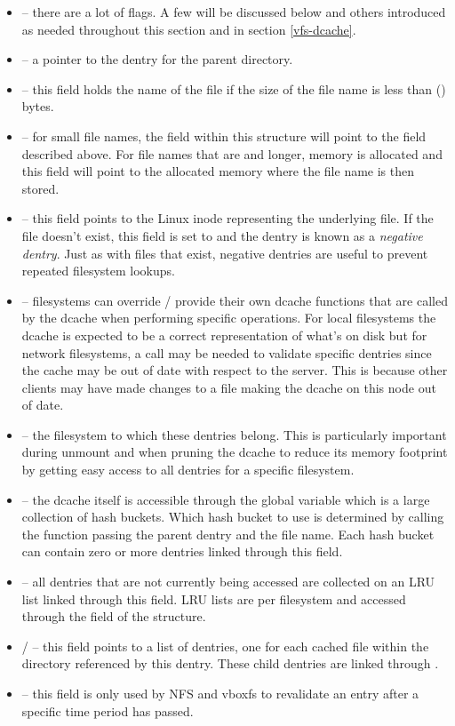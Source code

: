 \begin{itemize}
	\item {} -- there are a lot of flags. A few will be discussed below and others introduced as needed 
		throughout this section and in section \ref{vfs-dcache}.
	\item {} -- a pointer to the dentry for the parent directory.
	\item {} -- this field holds the name of the file if the size of the file name is less than 
		() bytes.
	\item {} -- for small file names, the  field within this  structure will point to the  field
		described above. For file names that are  and longer, memory is allocated 
		and this field will point to the allocated memory where the file name is then stored.
	\item {} -- this field points to the Linux inode representing the underlying file. If the file doesn't exist, this
		field is set to  and the dentry is known as a \textit{negative dentry}. Just as with files that exist, 
		negative dentries are useful to prevent repeated filesystem lookups.
	\item {} -- filesystems can override / provide their own dcache functions that are called by the dcache when 
		performing specific operations. For local filesystems the dcache is expected to be a correct representation of 
		what's on disk but for network filesystems, a call may be needed to validate specific dentries since the cache
		may be out of date with respect to the server. This is because other clients may have made changes to a file
		making the dcache on this node out of date.
	\item {} -- the filesystem to which these dentries belong. This is particularly important during unmount
		and when pruning the dcache to reduce its memory footprint by getting easy access to all dentries for a 
		specific filesystem.
	\item {} -- the dcache itself is accessible through the  global variable which is a large 
		collection of hash buckets. Which hash bucket to use is determined by calling the  function passing the 
		parent dentry and the file name. Each hash bucket can contain zero or more dentries linked through this field.
	\item {} -- all dentries that are not currently being accessed are collected on an LRU list linked through this 
		field. LRU lists are per filesystem and accessed through the  field of the  structure.
	\item {} /   -- this field points to a list of dentries, one for each cached file within the directory 	
		referenced by this dentry. These child dentries are linked through .
	\item {} -- this field is only used by NFS and vboxfs to revalidate an entry after a specific time period has passed.
\end{itemize}

